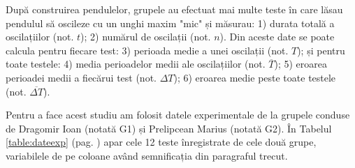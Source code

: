 \documentclass{article}
\begin{document}
După construirea pendulelor, grupele au efectuat mai multe teste în care
lăsau pendulul să oscileze cu un unghi maxim "mic" și măsurau:
1) durata totală a oscilațiilor (not. $ t $); 2) numărul de oscilații (not.
$ n $). Din aceste date se poate calcula pentru fiecare test: 3) perioada
medie a unei oscilații (not. $ T $); și pentru toate testele: 4) media
perioadelor medii ale oscilațiilor (not. $\overline{T}$); 5) eroarea
perioadei medii a fiecărui test (not. $\Delta T$); 6) eroarea medie peste
toate testele (not. $\overline{\Delta T}$).

Pentru a face acest studiu am folosit datele experimentale de la grupele
conduse de Dragomir Ioan (notată G1) și Prelipcean Marius (notată G2). În
Tabelul \ref{table:dateexp} (pag. \pageref{table:dateexp}) apar cele 12
teste înregistrate de cele două grupe, variabilele de pe coloane având
semnificația din paragraful trecut.
\end{document}
